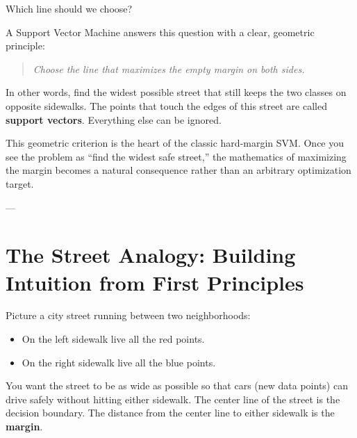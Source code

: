 \documentclass[11pt,journal,onecolumn]{IEEEtran}
\begin{document}
Which line should we choose?

A Support Vector Machine answers this question with a clear, geometric principle:
\begin{quote}
\textit{Choose the line that maximizes the empty margin on both sides.}
\end{quote}

In other words, find the widest possible street that still keeps the two classes on opposite sidewalks. The points that touch the edges of this street are called \textbf{support vectors}. Everything else can be ignored.

This geometric criterion is the heart of the classic hard-margin SVM. Once you see the problem as ``find the widest safe street,'' the mathematics of maximizing the margin becomes a natural consequence rather than an arbitrary optimization target.

---

\section{The Street Analogy: Building Intuition from First Principles}
\label{sec:analogy}

Picture a city street running between two neighborhoods:
\begin{itemize}
    \item On the left sidewalk live all the red points.
    \item On the right sidewalk live all the blue points.
\end{itemize}

You want the street to be as wide as possible so that cars (new data points) can drive safely without hitting either sidewalk. The center line of the street is the decision boundary. The distance from the center line to either sidewalk is the \textbf{margin}.

\vspace{0.3em}
\noindent{}
\vspace{0.3em}
\end{document}
